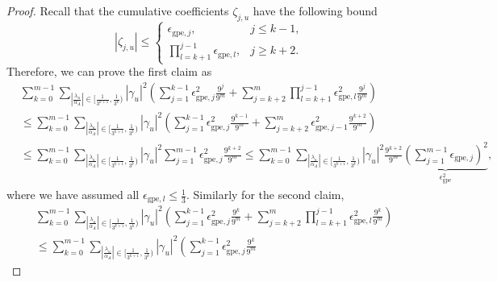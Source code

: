 \documentclass[letterpaper,onecolumn,11pt,accepted=2026-02-14]{quantumarticle}
\newcommand{\abs}[1]{\left\lvert#1\right\rvert}
\theoremstyle{remark}
\theoremstyle{plain}
\begin{document}
\begin{proof}
Recall that the cumulative coefficients $\zeta_{j,u}$ have the following bound
\begin{equation}
    \abs{\zeta_{j,u}}\leq
    \begin{cases}
        \epsilon_{\text{gpe},j},\qquad&j\leq k-1,\\
        \prod\limits_{l=k+1}^{j-1}\epsilon_{\text{gpe},l},&j\geq k+2.
    \end{cases}
\end{equation}
Therefore, we can prove the first claim as
\begin{equation}
\begin{aligned}
    &\sum_{k=0}^{m-1}\sum_{\abs{\frac{\lambda_u}{\alpha_A}}\in\big[\frac{1}{3^{k+1}},\frac{1}{3^k}\big)}
    \abs{\gamma_u}^2
    \left(\sum_{j=1}^{k-1}\epsilon_{\text{gpe},j}^2\frac{9^{j}}{9^m}
    +\sum_{j=k+2}^{m}\prod_{l=k+1}^{j-1}\epsilon_{\text{gpe},l}^2\frac{9^{j}}{9^m}\right)\\
    &\leq\sum_{k=0}^{m-1}\sum_{\abs{\frac{\lambda_u}{\alpha_A}}\in\big[\frac{1}{3^{k+1}},\frac{1}{3^k}\big)}
    \abs{\gamma_u}^2
    \left(\sum_{j=1}^{k-1}\epsilon_{\text{gpe},j}^2\frac{9^{k-1}}{9^m}
    +\sum_{j=k+2}^{m}\epsilon_{\text{gpe},j-1}^2\frac{9^{k+2}}{9^m}\right)\\
    &\leq\sum_{k=0}^{m-1}\sum_{\abs{\frac{\lambda_u}{\alpha_A}}\in\big[\frac{1}{3^{k+1}},\frac{1}{3^k}\big)}
    \abs{\gamma_u}^2
    \sum_{j=1}^{m-1}\epsilon_{\text{gpe},j}^2
    \frac{9^{k+2}}{9^m}
    \leq\sum_{k=0}^{m-1}\sum_{\abs{\frac{\lambda_u}{\alpha_A}}\in\big[\frac{1}{3^{k+1}},\frac{1}{3^k}\big)}
    \abs{\gamma_u}^2
    \frac{9^{k+2}}{9^m}
    \underbrace{\left(\sum_{j=1}^{m-1}\epsilon_{\text{gpe},j}\right)^2}_{\epsilon_{\text{gpe}}^2},
\end{aligned}
\end{equation}
where we have assumed all $\epsilon_{\text{gpe},l}\leq\frac{1}{3}$.
Similarly for the second claim,
\begin{equation}
\begin{aligned}
    &\sum_{k=0}^{m-1}\sum_{\abs{\frac{\lambda_u}{\alpha_A}}\in\big[\frac{1}{3^{k+1}},\frac{1}{3^k}\big)}
    \abs{\gamma_u}^2
    \left(\sum_{j=1}^{k-1}\epsilon_{\text{gpe},j}^2\frac{9^{k}}{9^m}
    +\sum_{j=k+2}^{m}\prod_{l=k+1}^{j-1}\epsilon_{\text{gpe},l}^2\frac{9^{k}}{9^m}\right)\\
    &\leq\sum_{k=0}^{m-1}\sum_{\abs{\frac{\lambda_u}{\alpha_A}}\in\big[\frac{1}{3^{k+1}},\frac{1}{3^k}\big)}
    \abs{\gamma_u}^2
    \left(\sum_{j=1}^{k-1}\epsilon_{\text{gpe},j}^2\frac{9^{k}}{9^m}

\end{aligned}
\end{equation}
\end{proof}
\end{document}
